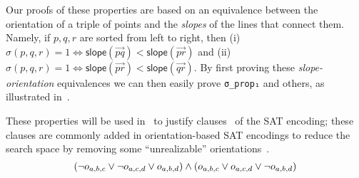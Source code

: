 Our proofs of these properties are based on an equivalence between
the orientation of a triple of points
and the \emph{slopes} of the lines that connect them.
Namely, if $p, q, r$  are sorted from left to right,
then (i) $\sigma(p,q,r)=1 \iff \textsf{slope}(\overrightarrow{pq}) < \textsf{slope}(\overrightarrow{pr})$
and (ii) $\sigma(p,q,r)=1 \iff \textsf{slope}(\overrightarrow{pr}) < \textsf{slope}(\overrightarrow{qr})$.
By first proving these \emph{slope-orientation} equivalences
we can then easily prove \lstinline|σ_prop₁| and others,
as illustrated in~.

These properties will be used in~
to justify clauses~ of the SAT encoding;
these clauses are commonly added in orientation-based SAT encodings
to reduce the search space by removing some ``unrealizable'' orientations~\cite{emptyHexagonNumber,scheucherTwoDisjoint5holes2020,subercaseaux2023minimizing, szekeres_peters_2006}.
\[
  \left(\neg \orvar_{a, b, c} \lor \neg \orvar_{a, c, d} \lor \orvar_{a, b, d}\right) \land
  \left(\orvar_{a, b, c} \lor \orvar_{a, c, d} \lor  \neg \orvar_{a, b, d}\right)
\]


